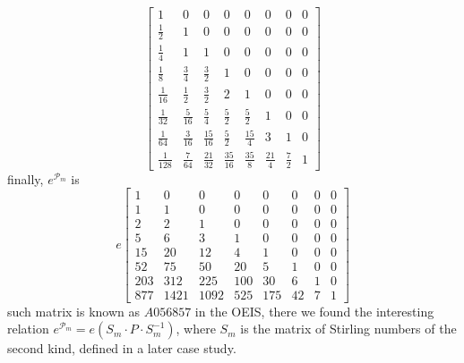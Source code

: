 \begin{displaymath}
\left[\begin{matrix}1 & 0 & 0 & 0 & 0 & 0 & 0 & 0\\\frac{1}{2} & 1 & 0 & 0 & 0 & 0 & 0 & 0\\\frac{1}{4} & 1 & 1 & 0 & 0 & 0 & 0 & 0\\\frac{1}{8} & \frac{3}{4} & \frac{3}{2} & 1 & 0 & 0 & 0 & 0\\\frac{1}{16} & \frac{1}{2} & \frac{3}{2} & 2 & 1 & 0 & 0 & 0\\\frac{1}{32} & \frac{5}{16} & \frac{5}{4} & \frac{5}{2} & \frac{5}{2} & 1 & 0 & 0\\\frac{1}{64} & \frac{3}{16} & \frac{15}{16} & \frac{5}{2} & \frac{15}{4} & 3 & 1 & 0\\\frac{1}{128} & \frac{7}{64} & \frac{21}{32} & \frac{35}{16} & \frac{35}{8} & \frac{21}{4} & \frac{7}{2} & 1\end{matrix}\right]
\end{displaymath}
finally, $e^{\mathcal{P}_{m}}$ is
\begin{displaymath}
e \left[\begin{matrix}1 & 0 & 0 & 0 & 0 & 0 & 0 & 0\\1 & 1 & 0 & 0 & 0 & 0 & 0 & 0\\2 & 2 & 1 & 0 & 0 & 0 & 0 & 0\\5 & 6 & 3 & 1 & 0 & 0 & 0 & 0\\15 & 20 & 12 & 4 & 1 & 0 & 0 & 0\\52 & 75 & 50 & 20 & 5 & 1 & 0 & 0\\203 & 312 & 225 & 100 & 30 & 6 & 1 & 0\\877 & 1421 & 1092 & 525 & 175 & 42 & 7 & 1\end{matrix}\right]
\end{displaymath}
such matrix is known as $A056857$ in the OEIS, there we found
the interesting relation $e^{\mathcal{P}_{m}}=e\left(S_{m}\cdot P\cdot S_{m}^{-1}\right)$,
where $S_{m}$ is the matrix of Stirling numbers of the second kind, defined in a later case study.

